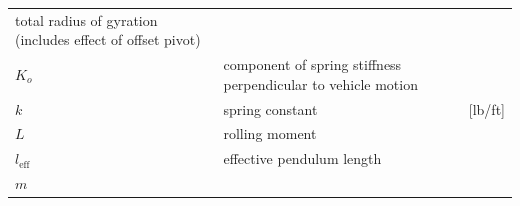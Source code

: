 \documentclass[
]{book}
\begin{document}
\begin{longtable}[]{@{}lll@{}}
\begin{minipage}[t]{0.68\columnwidth}
total radius of gyration (includes effect of offset pivot)\strut
\end{minipage} & \begin{minipage}[t]{0.10\columnwidth}\raggedright
\strut
\end{minipage}\tabularnewline
\begin{minipage}[t]{0.14\columnwidth}\raggedright
\(K_o\)\strut
\end{minipage} & \begin{minipage}[t]{0.68\columnwidth}\raggedright
component of spring stiffness perpendicular to vehicle motion\strut
\end{minipage} & \begin{minipage}[t]{0.10\columnwidth}\raggedright
\strut
\end{minipage}\tabularnewline
\begin{minipage}[t]{0.14\columnwidth}\raggedright
\(k\)\strut
\end{minipage} & \begin{minipage}[t]{0.68\columnwidth}\raggedright
spring constant\strut
\end{minipage} & \begin{minipage}[t]{0.10\columnwidth}\raggedright
{[}lb/ft{]}\strut
\end{minipage}\tabularnewline
\begin{minipage}[t]{0.14\columnwidth}\raggedright
\(L\)\strut
\end{minipage} & \begin{minipage}[t]{0.68\columnwidth}\raggedright
rolling moment\strut
\end{minipage} & \begin{minipage}[t]{0.10\columnwidth}\raggedright
\strut
\end{minipage}\tabularnewline
\begin{minipage}[t]{0.14\columnwidth}\raggedright
\(l_{\mathrm{eff}}\)\strut
\end{minipage} & \begin{minipage}[t]{0.68\columnwidth}\raggedright
effective pendulum length\strut
\end{minipage} & \begin{minipage}[t]{0.10\columnwidth}\raggedright
\strut
\end{minipage}\tabularnewline
\begin{minipage}[t]{0.14\columnwidth}\raggedright
\(m\)\strut
\end{minipage} & \begin{minipage}[t]{0.68\columnwidth}\raggedright

\end{minipage}
\end{longtable}
\end{document}
